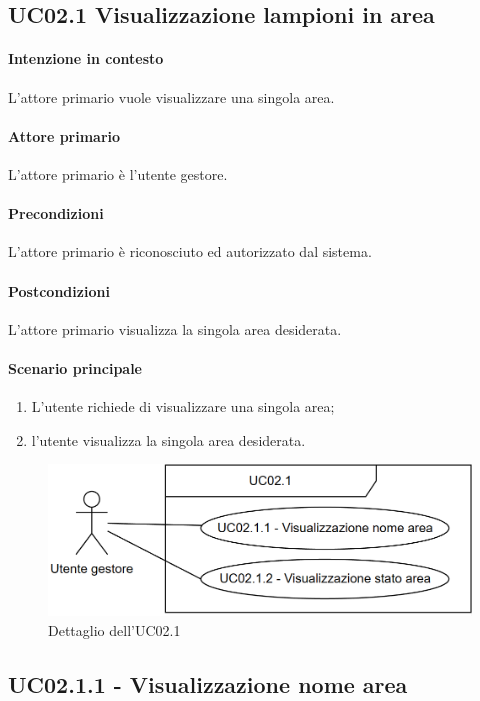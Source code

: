 \subsection{UC02.1 Visualizzazione lampioni in area}
\paragraph{Intenzione in contesto} L'attore primario vuole visualizzare una singola area.

\paragraph{Attore primario} L'attore primario è l'utente gestore.
\paragraph{Precondizioni} L'attore primario è riconosciuto ed autorizzato dal sistema.
\paragraph{Postcondizioni} L'attore primario visualizza la singola area desiderata.

\paragraph{Scenario principale}
\begin{enumerate}
    \item L'utente richiede di visualizzare una singola area;
    \item l'utente visualizza la singola area desiderata.
\end{enumerate}

\begin{figure}[h]
    \includegraphics[width=\textwidth]{contenuti/img/casi_uso_grafici-uc02.1.png}
    \caption{Dettaglio dell'UC02.1}
    \label{fig:uc02.1}
\end{figure}

\subsection{UC02.1.1 - Visualizzazione nome area}\label{uc:02.1.1}

